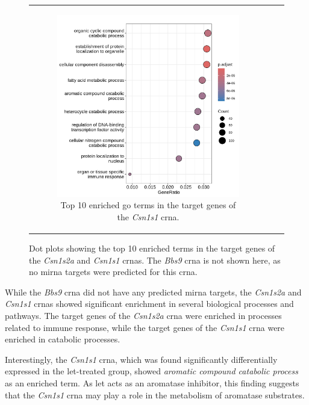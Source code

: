 \begin{figure}[H]
\begin{tabular}{ccc}
\begin{subfigure}{0.5\textwidth}
            \includegraphics[width=\linewidth]{chapters/4_results_and_discussion/figures/dea/deseq2/letrozole/chr5:87817372-87821139_targets.txt.png}
            \caption{Top 10 enriched \gls{go} terms in the target
                genes of the \textit{Csn1s1} \gls{crna}.
            }
            \label{fig:tg_csn1s1}
        \end{subfigure}
    \end{tabular}
    \caption{Dot plots showing the top 10 enriched terms in the target genes of
        the \textit{Csn1s2a} and \textit{Csn1s1} \glspl{crna}.
        The \textit{Bbs9} \gls{crna} is not shown here, as no \gls{mirna} targets were
        predicted for this \gls{crna}.
    }
    \label{fig:target_genes}
\end{figure}

While the \textit{Bbs9} \gls{crna} did not have any predicted \gls{mirna}
targets, the \textit{Csn1s2a} and \textit{Csn1s1} \glspl{crna} showed
significant enrichment in several biological processes and pathways.
The target genes of the \textit{Csn1s2a} \gls{crna} were enriched in processes
related to immune response, while the target genes of the \textit{Csn1s1}
\gls{crna} were enriched in catabolic processes.

Interestingly, the \textit{Csn1s1} \gls{crna}, which was found significantly
differentially expressed in the \gls{let}-treated group, showed
\textit{aromatic compound catabolic process} as an enriched term.
As \gls{let} acts as an aromatase inhibitor, this finding suggests that the
\textit{Csn1s1} \gls{crna} may play a role in the metabolism of aromatase
substrates.
